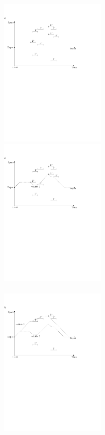 \documentclass[dissertation,draft*]{aaltoseries}
\begin{document}
\begin{figure}[ht]
\includegraphics[width=0.45\textwidth]{greedy01b.pdf} \ \ \ \ \  \ \ \ \ \  
\includegraphics[width=0.45\textwidth]{greedy05b.pdf}  \\ \ \\  
\includegraphics[width=0.45\textwidth]{greedy06b.pdf} \ \ \ \ \  \ \ \ \ \   

\end{figure}
\end{document}
